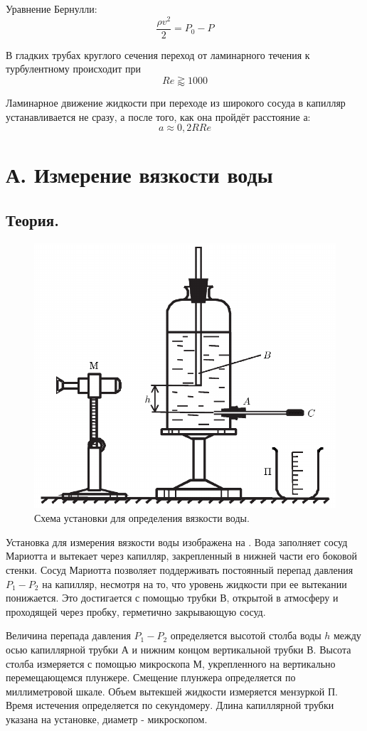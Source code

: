 \documentclass[a4paper, 12pt]{article}
\begin{document}
Уравнение Бернулли:
\begin{equation}
  \frac{\rho v^{2}}{2}= P_{0} - P \label{eq:Bernoulli_eq}
\end{equation}

В гладких трубах круглого сечения переход от ламинарного течения к
турбулентному происходит при
\[
  Re \gtrapprox 1000
\]

Ламинарное движение жидкости при переходе из широкого сосуда в капилляр устанавливается
не сразу, а после того, как она пройдёт расстояние а:
\[
  a \approx 0,2 R Re
\]

\section{А. Измерение вязкости воды}
\subsection{Теория.}

\begin{figure}[H]
  \centering
  \includegraphics[scale=0.7]{data/a.png}
  \caption{Схема установки для определения вязкости воды.}
  \label{fig:vac}
\end{figure}

Установка для измерения вязкости воды изображена на . Вода заполняет
сосуд Мариотта и вытекает через капилляр, закрепленный в нижней части его
боковой стенки. Сосуд Мариотта позволяет поддерживать постоянный перепад давления
$P_{1} - P_{2}$ на капилляр, несмотря на то, что уровень жидкости при ее вытекании
понижается. Это достигается с помощью трубки В, открытой в атмосферу и проходящей
через пробку, герметично закрывающую сосуд. \par Величина перепада давления $P_{1}
  - P_{2}$ определяется высотой столба воды $h$ между осью капиллярной трубки А и
нижним концом вертикальной трубки В. Высота столба измеряется с помощью
микроскопа М, укрепленного на вертикально перемещающемся плунжере. Смещение
плунжера определяется по миллиметровой шкале. Объем вытекшей жидкости измеряется
мензуркой П. Время истечения определяется по секундомеру. Длина капиллярной трубки
указана на установке, диаметр - микроскопом.
\end{document}

